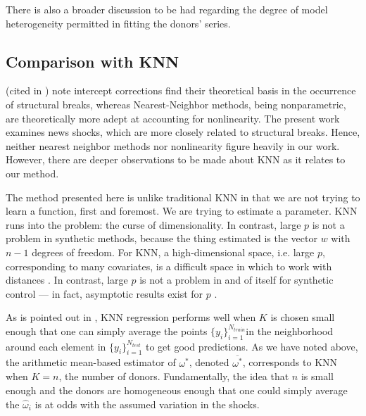 \documentclass[11pt,3p,review,authoryear]{elsarticle}
\theoremstyle{definition}
\begin{document}
There is also a broader discussion to be had regarding the degree of model heterogeneity permitted in fitting the donors' series.  

\subsection{Comparison with KNN}

\cite{clements1996intercept} (cited in \cite{guerron2017macroeconomic})  note intercept corrections find their theoretical basis in the occurrence of structural breaks, whereas Nearest-Neighbor methods, being nonparametric, are theoretically more adept at accounting for nonlinearity.  The present work examines news shocks, which are more closely related to structural breaks.  Hence, neither nearest neighbor methods nor nonlinearity figure heavily in our work.  However, there are deeper observations to be made about KNN as it relates to our method.

The method presented here is unlike traditional KNN in that we are not trying to learn a function, first and foremost.  We are trying to estimate a parameter.  KNN runs into the problem: the curse of dimensionality.  In contrast, large $p$ is not a problem in synthetic methods, because the thing estimated is the vector $w$ with $n-1$ degrees of freedom.  For KNN, a high-dimensional space, i.e. large $p$, corresponding to many covariates, is a difficult space in which to work with distances \citep{hastie2009elements}.  In contrast, large $p$ is not a problem in and of itself for synthetic control --- in fact, asymptotic results exist for $p$ \citep{abadie2010synthetic}.  

As is pointed out in \citet{hastie2009elements}, KNN regression performs well when $K$ is chosen small enough that one can simply average the points $\{y_{i}\}_{i=1}^{N_{train}}$in the neighborhood around each element in $\{y_{i}\}_{i=1}^{N_{test}}$ to get good predictions.  As we have noted above, the arithmetic mean-based estimator of $\omega^{*}$, denoted $\overline{\omega^{*}}$, corresponds to KNN when $K = n$, the number of donors.  Fundamentally, the idea that $n$ is small enough and the donors are homogeneous enough that one could simply average the $\hat\omega_{i}$ is at odds with the assumed variation in the shocks.
\end{document}
